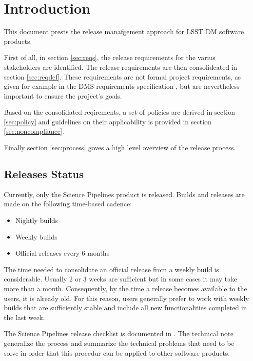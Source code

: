 \section{Introduction} \label{sec:intro}

This document prests the release manafgement approach for \gls{LSST} \gls{DM} software products.

First of all, in section \ref{sec:reqs}, the release requirements for the varius  stakeholders are identified.
The release requirements are then consolideated in section \ref{sec:reqdef}.
These requirements are not formal project requirements, as given for example in the \gls{DMS} requirements specification , but are nevertheless important to ensure the project's goals.

Based on the consolidated reqirements, a set of policies are derived in section \ref{sec:policy} and guidelines on their applicability is provided in section \ref{sec:noncompliance}.

Finally section \ref{sec:process} goves a high level overview of the release process.


\subsection{Releases Status}\label{sec:sci}

Currently, only the \gls{Science Pipelines} product is released. 
Builds and releases are made on the following time-based cadence:

\begin{itemize}
\item Nightly builds
\item Weekly builds
\item Official releases every 6 months
\end{itemize}

The time needed to consolidate an official release from a weekly build is considerable.
Usually 2 or 3 weeks are sufficient but in some cases it may take more than a month. 
Consequently, by the time a release becomes available to the users, it is already old.
For this reason, users generally prefer to work with weekly builds that are sufficiently stable and include all new functionalities completed in the last week.

The \gls{Science Pipelines} release checklist is documented in .
The technical note  generalize the process and summarize the technical problems that need to be solve in order that this procedur can be applied to other software products.


